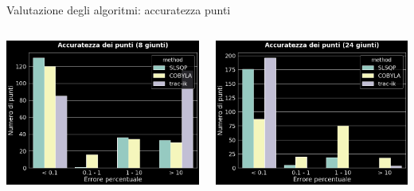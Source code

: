 \begin{frame}{Valutazione degli algoritmi: accuratezza punti}
\begin{columns}
\begin{column}{0.35\textwidth}
\includegraphics[width=\textwidth]{slide/img_cinematica_inversa/accuratezza_8.png}

\hfill

\end{column}
\begin{column}{0.7\textwidth}
\includegraphics[width=\textwidth]{slide/img_cinematica_inversa/accuratezza_24.png}
\end{column}
\end{columns}

\end{frame}


